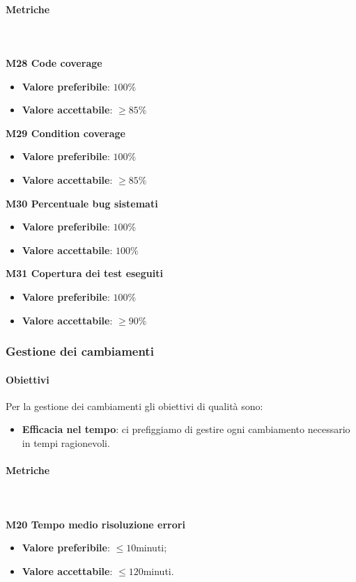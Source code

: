 		\paragraph{Metriche} \mbox{} \\ \\
		\textbf{M28 Code coverage}
		\begin{itemize}
			\item \textbf{Valore preferibile}: $100\%$
			\item \textbf{Valore accettabile}: $\ge 85\%$
		\end{itemize}
		\textbf{M29 Condition coverage}
		\begin{itemize}
			\item \textbf{Valore preferibile}: $100\%$
			\item \textbf{Valore accettabile}: $\ge 85\%$ 
		\end{itemize}
		\textbf{M30 Percentuale bug sistemati}
		\begin{itemize}
			\item \textbf{Valore preferibile}: $100\%$
			\item \textbf{Valore accettabile}: $100\%$  
		\end{itemize}
		\textbf{M31 Copertura dei test eseguiti}
		\begin{itemize}
			\item \textbf{Valore preferibile}: $100\%$
			\item \textbf{Valore accettabile}: $\ge 90\%$  
		\end{itemize}
			
		\subsubsection{Gestione dei cambiamenti}
		\paragraph{Obiettivi}
		Per la gestione dei cambiamenti gli obiettivi di qualità sono:
		\begin{itemize}
			\item \textbf{Efficacia nel tempo}: ci prefiggiamo di gestire ogni cambiamento necessario in tempi ragionevoli.
		\end{itemize}
		 	\paragraph{Metriche} \mbox{} \\ \\
		 	\textbf{M20 Tempo medio risoluzione errori}
			\begin{itemize}
				\item \textbf{Valore preferibile}: $\le 10$minuti;
				\item \textbf{Valore accettabile}: $\le 120$minuti.
			\end{itemize}
      

